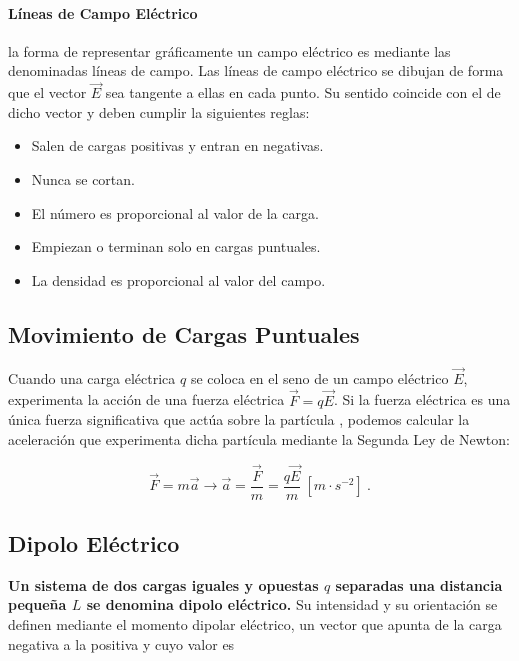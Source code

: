 \documentclass{tufte-handout}
\begin{document}
\paragraph{Líneas de Campo Eléctrico} la forma de representar gráficamente un campo eléctrico es mediante las denominadas líneas de campo. Las líneas de campo eléctrico se dibujan de forma que el vector $\vec{E}$ sea tangente a ellas en cada punto. Su sentido coincide con el de dicho vector y deben cumplir la siguientes reglas:

\begin{itemize}
    \item Salen de cargas positivas y entran en negativas.
    \item Nunca se cortan.
    \item El número es proporcional al valor de la carga.
    \item Empiezan o terminan solo en cargas puntuales.
    \item La densidad es proporcional al valor del campo.
\end{itemize}

\subsection{Movimiento de Cargas Puntuales}

Cuando una carga eléctrica $q$ se coloca en el seno de un campo eléctrico $\vec{E}$, experimenta la acción de una fuerza eléctrica $\vec{F} = q\vec{E}$. Si la fuerza eléctrica es una única fuerza significativa que actúa sobre la partícula , podemos calcular la aceleración que experimenta dicha partícula mediante la Segunda Ley de Newton:

\begin{equation}
\vec{F} = m\vec{a} \rightarrow \vec{a} = \frac{\vec{F}}{m} = \frac{q\vec{E}}{m}~[m\cdot s^{-2}]~.
\end{equation}

\subsection{Dipolo Eléctrico}

\textbf{Un sistema de dos cargas iguales y opuestas $q$ separadas una distancia pequeña $L$ se denomina dipolo eléctrico.} Su intensidad y su orientación se definen mediante el momento dipolar eléctrico, un vector que apunta de la carga negativa a la positiva y cuyo valor es
\end{document}
